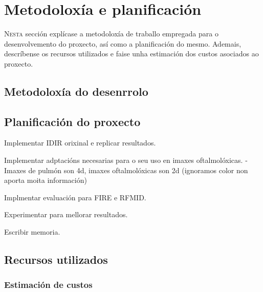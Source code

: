 \chapter{Metodoloxía e planificación}
\label{chap:Metodoloxía e planificación}
\lettrine{N}{esta} sección explícase a metodoloxía de traballo empregada para o desenvolvemento do proxecto, así como a planificación do mesmo.
 Ademais, descríbense os recursos utilizados e faise unha estimación dos custos asociados ao proxecto.

\section{Metodoloxía do desenrrolo}
\label{sec:Metodoloxía do desenrrolo}



\section{Planificación do proxecto}
\label{sec:Planificación do proxecto}

Implementar IDIR orixinal e replicar resultados.

Implementar adptacións necesarias para o seu uso en imaxes oftalmolóxicas.
    - Imaxes de pulmón son 4d, imaxes oftalmolóxicas son 2d (ignoramos color non aporta moita información)

Implmentar evaluación para FIRE e RFMID.

Experimentar para mellorar resultados.

Escribir memoria.

\section{Recursos utilizados}
\label{sec:Recursos utilizados}

\subsection{Estimación de custos}
\label{subsec:Estimación de custos}

